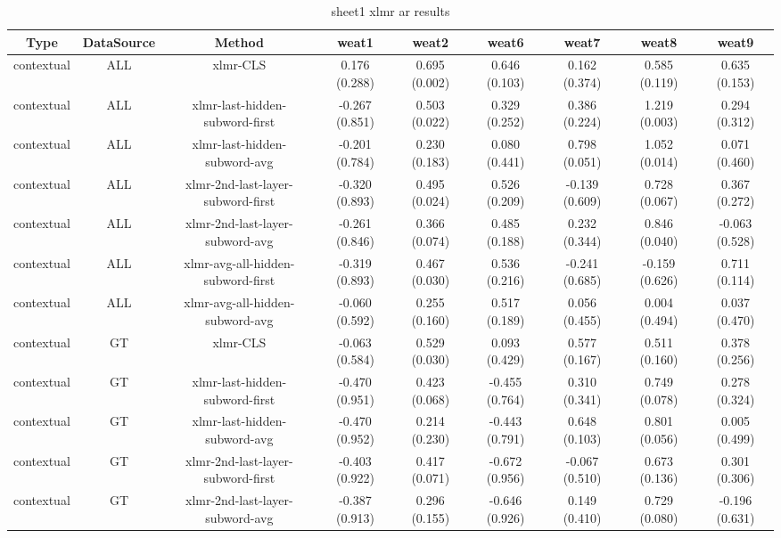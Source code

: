 \begin{sidewaystable}[htb]
    \centering
    \caption{sheet1 xlmr ar results}
    \label{appendix_tab:sheet1_xlmr_ar_results}
    \small
    \begin{tabular}{@{}ccccccccc@{}}
        \toprule
        Type & DataSource & Method & weat1 & weat2 & weat6 & weat7 & weat8 & weat9 \\
        \midrule
        contextual & ALL & xlmr-CLS & 0.176 (0.288) & 0.695 (0.002) & 0.646 (0.103) & 0.162 (0.374) & 0.585 (0.119) & 0.635 (0.153) \\
        contextual & ALL & xlmr-last-hidden-subword-first & -0.267 (0.851) & 0.503 (0.022) & 0.329 (0.252) & 0.386 (0.224) & 1.219 (0.003) & 0.294 (0.312) \\
        contextual & ALL & xlmr-last-hidden-subword-avg & -0.201 (0.784) & 0.230 (0.183) & 0.080 (0.441) & 0.798 (0.051) & 1.052 (0.014) & 0.071 (0.460) \\
        contextual & ALL & xlmr-2nd-last-layer-subword-first & -0.320 (0.893) & 0.495 (0.024) & 0.526 (0.209) & -0.139 (0.609) & 0.728 (0.067) & 0.367 (0.272) \\
        contextual & ALL & xlmr-2nd-last-layer-subword-avg & -0.261 (0.846) & 0.366 (0.074) & 0.485 (0.188) & 0.232 (0.344) & 0.846 (0.040) & -0.063 (0.528) \\
        contextual & ALL & xlmr-avg-all-hidden-subword-first & -0.319 (0.893) & 0.467 (0.030) & 0.536 (0.216) & -0.241 (0.685) & -0.159 (0.626) & 0.711 (0.114) \\
        contextual & ALL & xlmr-avg-all-hidden-subword-avg & -0.060 (0.592) & 0.255 (0.160) & 0.517 (0.189) & 0.056 (0.455) & 0.004 (0.494) & 0.037 (0.470) \\
        contextual & GT & xlmr-CLS & -0.063 (0.584) & 0.529 (0.030) & 0.093 (0.429) & 0.577 (0.167) & 0.511 (0.160) & 0.378 (0.256) \\
        contextual & GT & xlmr-last-hidden-subword-first & -0.470 (0.951) & 0.423 (0.068) & -0.455 (0.764) & 0.310 (0.341) & 0.749 (0.078) & 0.278 (0.324) \\
        contextual & GT & xlmr-last-hidden-subword-avg & -0.470 (0.952) & 0.214 (0.230) & -0.443 (0.791) & 0.648 (0.103) & 0.801 (0.056) & 0.005 (0.499) \\
        contextual & GT & xlmr-2nd-last-layer-subword-first & -0.403 (0.922) & 0.417 (0.071) & -0.672 (0.956) & -0.067 (0.510) & 0.673 (0.136) & 0.301 (0.306) \\
        contextual & GT & xlmr-2nd-last-layer-subword-avg & -0.387 (0.913) & 0.296 (0.155) & -0.646 (0.926) & 0.149 (0.410) & 0.729 (0.080) & -0.196 (0.631) \\

\end{tabular}
\end{sidewaystable}
